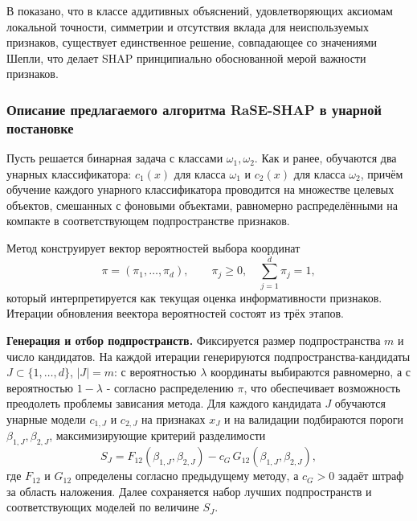 \documentclass[12pt,a4paper]{article}
\begin{document}
В \cite{lundberg2017shap} показано, что в классе аддитивных объяснений, удовлетворяющих
аксиомам локальной точности, симметрии и отсутствия вклада для неиспользуемых признаков,
существует единственное решение, совпадающее со значениями Шепли,
что делает SHAP принципиально обоснованной мерой важности признаков.

\subsubsection{Описание предлагаемого алгоритма RaSE-SHAP в унарной постановке}

Пусть решается бинарная задача с классами $\omega_1,\omega_2$. Как и ранее, обучаются два унарных
классификатора: $c_1(x)$ для класса $\omega_1$ и $c_2(x)$ для класса $\omega_2$, причём обучение
каждого унарного классификатора проводится на множестве целевых объектов, смешанных с фоновыми объектами,
равномерно распределёнными на компакте в соответствующем подпространстве признаков.

Метод конструирует вектор вероятностей выбора координат
\begin{equation}
\pi=(\pi_1,\dots,\pi_d),\qquad \pi_j\ge 0,\quad \sum_{j=1}^d \pi_j=1,
\end{equation}
который интерпретируется как текущая оценка информативности признаков. Итерации обновления веектора вероятностей состоят
из трёх этапов.

\medskip
\noindent\textbf{Генерация и отбор подпространств.}
Фиксируется размер подпространства $m$ и число кандидатов. На каждой итерации генерируются
подпространства-кандидаты $J\subset\{1,\dots,d\}$, $|J|=m$:
с вероятностью $\lambda$ координаты выбираются равномерно, а с вероятностью $1-\lambda$
- согласно распределению $\pi$, что обеспечивает возможность преодолеть проблемы зависания метода.
Для каждого кандидата $J$ обучаются унарные модели $c_{1,J}$ и $c_{2,J}$ на признаках $x_J$ и
на валидации подбираются пороги $\beta_{1,J},\beta_{2,J}$, максимизирующие критерий разделимости
\begin{equation}
S_J = F_{12}(\beta_{1,J},\beta_{2,J}) - c_G\,G_{12}(\beta_{1,J},\beta_{2,J}),
\end{equation}
где $F_{12}$ и $G_{12}$ определены согласно предыдущему методу, а $c_G>0$ задаёт штраф за область наложения.
Далее сохраняется набор лучших подпространств и соответствующих моделей по величине $S_J$.
\end{document}
